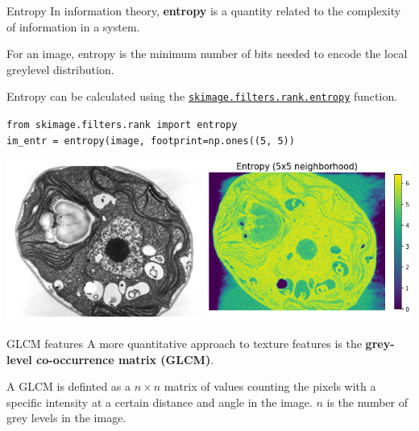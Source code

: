 \documentclass[9pt, aspectratio=169]{beamer}
\begin{document}
\begin{frame}
    {Entropy}
    In information theory, \textbf{entropy} is a quantity related to the complexity of information in a system.

    For an image, entropy is the minimum number of bits needed to encode the local greylevel distribution.

    Entropy can be calculated using the \href{https://scikit-image.org/docs/dev/api/skimage.filters.rank.html\#skimage.filters.rank.entropy}{\texttt{\underline{skimage.filters.rank.entropy}}} function.

    \begin{codebox}
        \texttt{from skimage.filters.rank import entropy\\
            im\_entr = entropy(image, footprint=np.ones((5, 5))}
    \end{codebox}
    \centering
    \includegraphics[width=.75\textwidth]{entropy.png}
\end{frame}

\begin{frame}
    {GLCM features}
    A more quantitative approach to texture features is the \textbf{grey-level co-occurrence matrix (GLCM)}.\\
    \vspace{2em}

    A GLCM is definted as a $n\times n$ matrix of values counting the pixels with a specific intensity at a certain distance and angle in the image. $n$ is the number of grey levels in the image.\\
\end{frame}
\end{document}
